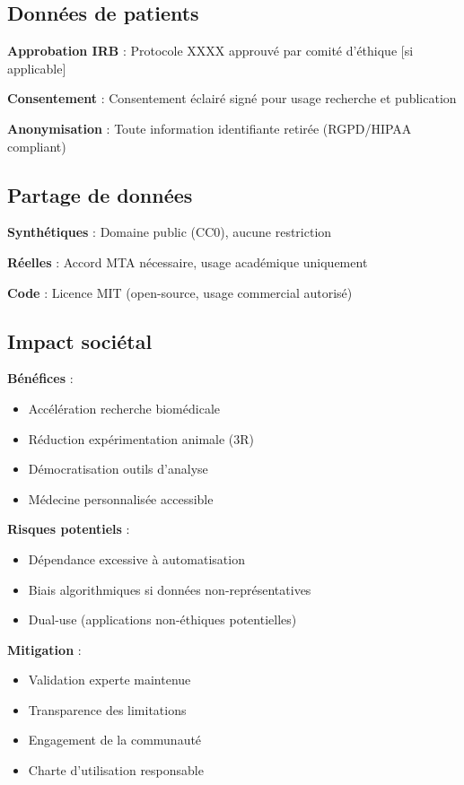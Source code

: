 \subsection{Données de patients}

\textbf{Approbation IRB} : Protocole XXXX approuvé par comité d'éthique [si applicable]

\textbf{Consentement} : Consentement éclairé signé pour usage recherche et publication

\textbf{Anonymisation} : Toute information identifiante retirée (RGPD/HIPAA compliant)

\subsection{Partage de données}

\textbf{Synthétiques} : Domaine public (CC0), aucune restriction

\textbf{Réelles} : Accord MTA nécessaire, usage académique uniquement

\textbf{Code} : Licence MIT (open-source, usage commercial autorisé)

\subsection{Impact sociétal}

\textbf{Bénéfices} :
\begin{itemize}
    \item Accélération recherche biomédicale
    \item Réduction expérimentation animale (3R)
    \item Démocratisation outils d'analyse
    \item Médecine personnalisée accessible
\end{itemize}

\textbf{Risques potentiels} :
\begin{itemize}
    \item Dépendance excessive à automatisation
    \item Biais algorithmiques si données non-représentatives
    \item Dual-use (applications non-éthiques potentielles)
\end{itemize}

\textbf{Mitigation} :
\begin{itemize}
    \item Validation experte maintenue
    \item Transparence des limitations
    \item Engagement de la communauté
    \item Charte d'utilisation responsable
\end{itemize}

